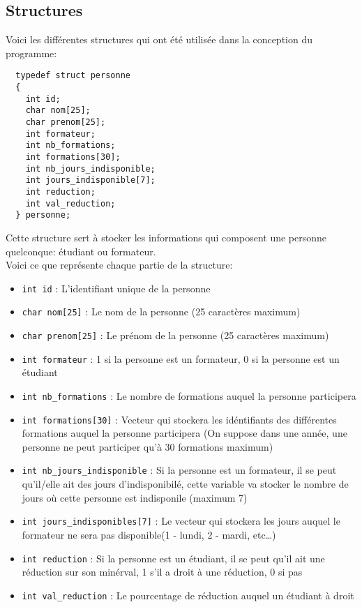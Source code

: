 \documentclass[11pt]{article}
\begin{document}
\subsection{Structures}
Voici les différentes structures qui ont été utilisée dans la conception du programme:

\begin{lstlisting}
  typedef struct personne
  {
    int id;
    char nom[25];
    char prenom[25];
    int formateur;
    int nb_formations;
    int formations[30];
    int nb_jours_indisponible;
    int jours_indisponible[7];
    int reduction;
    int val_reduction;
  } personne;
\end{lstlisting}

Cette structure sert à stocker les informations qui composent une personne quelconque: étudiant ou formateur.\\
Voici ce que représente chaque partie de la structure:
\begin{itemize}
\item \texttt{int id} : L'identifiant unique de la personne
\item \texttt{char nom[25]} : Le nom de la personne (25 caractères maximum)
\item \texttt{char prenom[25]} : Le prénom de la personne (25 caractères maximum)
\item \texttt{int formateur} : 1 si la personne est un formateur, 0 si la personne est un étudiant
\item \texttt{int nb\_formations} : Le nombre de formations auquel la personne participera
\item \texttt{int formations[30]} : Vecteur qui stockera les idéntifiants des différentes formations auquel la personne participera (On suppose dans une année, une personne ne peut participer qu'à 30 formations maximum)
\item \texttt{int nb\_jours\_indisponible} : Si la personne est un formateur, il se peut qu'il/elle ait des jours d'indisponibilé, cette variable va stocker le nombre de jours où cette personne est indisponile (maximum 7)
\item \texttt{int jours\_indisponibles[7]} : Le vecteur qui stockera les jours auquel le formateur ne sera pas disponible(1 - lundi, 2 - mardi, etc\ldots)
\item \texttt{int reduction} : Si la personne est un étudiant, il se peut qu'il ait une réduction sur son minérval, 1 s'il a droit à une réduction, 0 si pas
  \item \texttt{int val\_reduction} : Le pourcentage de réduction auquel un étudiant à droit
\end{itemize}
\end{document}
